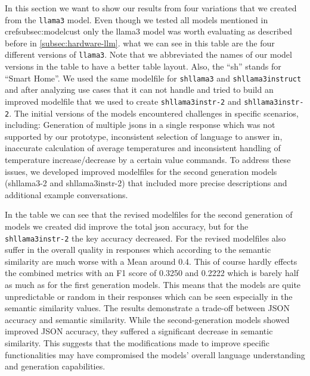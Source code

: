 In this section we want to show our results from four variations that we created from the \texttt{llama3} model. Even though we tested all models mentioned in cref{subsec:modelcust} only the llama3 model was worth evaluating as described before in \cref{subsec:hardware-llm}.
what we can see in this table are the four different versions of \texttt{llama3}. Note that we abbreviated the names of our model versions in the table to have a better table layout. Also, the ``sh'' stands for ``Smart Home''. We used the same modelfile for \texttt{shllama3} and \texttt{shllama3instruct} and after analyzing use cases that it can not handle and tried to build an improved modelfile that we used to create \texttt{shllama3instr-2} and \texttt{shllama3instr-2}.
The initial versions of the models encountered challenges in specific scenarios, including:
Generation of multiple \glspl{json} in a single response which was not supported by our prototype,
inconsistent selection of language to answer in,
inaccurate calculation of average temperatures and
inconsistent handling of temperature increase/decrease by a certain value commands.
To address these issues, we developed improved modelfiles for the second generation models (shllama3-2 and shllama3instr-2) that included more precise descriptions and additional example conversations.


In the table we can see that the revised modelfiles for the second generation of models we created did improve the total \gls{json} accuracy, but for the \texttt{shllama3instr-2} the key accuracy decreased. For the revised modelfiles also suffer in the overall quality in responses which according to the semantic similarity are much worse with a Mean around 0.4.
This of course hardly effects the combined metrics with an F1 score of 0.3250 and 0.2222 which is barely half as much as for the first generation models. This means that the models are quite unpredictable or random in their responses which can be seen especially in the semantic similarity values.
The results demonstrate a trade-off between JSON accuracy and semantic similarity. While the second-generation models showed improved JSON accuracy, they suffered a significant decrease in semantic similarity. This suggests that the modifications made to improve specific functionalities may have compromised the models' overall language understanding and generation capabilities.

